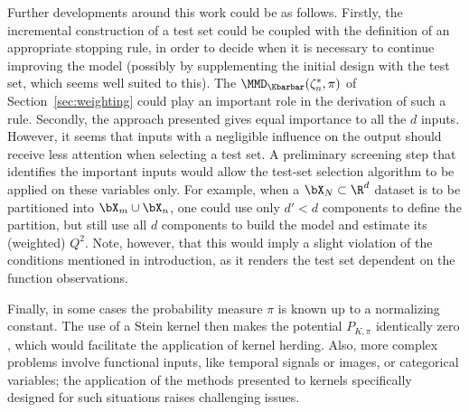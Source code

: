 Further developments around this work could be as follows. 
Firstly, the incremental construction of a test set could be coupled with the definition of an appropriate stopping rule, in order to decide when it is necessary to continue improving the model (possibly by supplementing the initial design with the test set, which seems well suited to this). 
The $\MMD_{\Kbarbar}(\zeta_n^*,\pi)$ of Section~\ref{sec:weighting} could play an important role in the derivation of such a rule. 
Secondly, the approach presented gives equal importance to all the $d$ inputs. 
However, it seems that inputs with a negligible influence on the output should receive less attention when selecting a test set. 
A preliminary screening step that identifies the important inputs would allow the test-set selection algorithm to be applied on these variables only. 
For example, when a $\bX_N\subset\R^d$ dataset is to be partitioned into $\bX_m\cup\bX_n$, one could use only $d'<d$ components to define the partition, but still use all $d$ components to build the model and estimate its (weighted) $Q^2$. 
Note, however, that this would imply a slight violation of the conditions mentioned in introduction, as it renders the test set dependent on the function observations. 

Finally, in some cases the probability measure $\pi$ is known up to a normalizing constant. 
The use of a Stein kernel then makes the potential $P_{K,\pi}$ identically zero \citep{chen_2018_stein_points}, which would facilitate the application of kernel herding. 
Also, more complex problems involve functional inputs, like temporal signals or images, or categorical variables; the application of the methods presented to kernels specifically designed for such situations raises challenging issues. 






